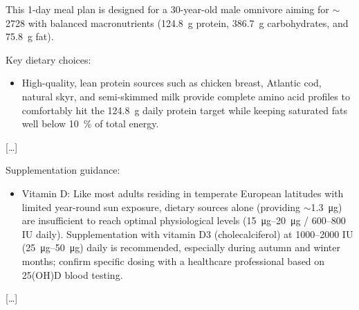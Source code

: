 This 1-day meal plan is designed for a 30-year-old male omnivore aiming for $\sim$\qty{2728}{\kcal} with balanced macronutrients (\qty{124.8}{\gram} protein, \qty{386.7}{\gram} carbohydrates, and \qty{75.8}{\gram} fat).

Key dietary choices:

\begin{itemize}
    \item High-quality, lean protein sources such as chicken breast, Atlantic cod, natural skyr, and semi-skimmed milk provide complete amino acid profiles to comfortably hit the \qty{124.8}{\gram} daily protein target while keeping saturated fats well below \qty{10}{\percent} of total energy.
\end{itemize}
[\ldots]

Supplementation guidance:

\begin{itemize}
    \item Vitamin D: Like most adults residing in temperate European latitudes with limited year-round sun exposure, dietary sources alone (providing $\sim$\qty{1.3}{\micro\gram}) are insufficient to reach optimal physiological levels (\qtyrange{15}{20}{\micro\gram} / \numrange{600}{800} IU daily). Supplementation with vitamin D3 (cholecalciferol) at \numrange{1000}{2000} IU (\qtyrange{25}{50}{\micro\gram}) daily is recommended, especially during autumn and winter months; confirm specific dosing with a healthcare professional based on 25(OH)D blood testing.
\end{itemize}
[\ldots]

